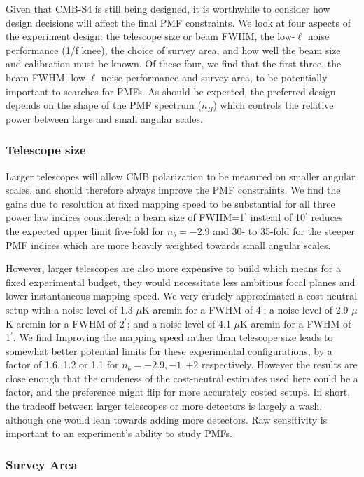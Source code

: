 \documentclass[apj]{emulateapj}
\newcommand{\ukarcmin}{\ensuremath{\mu}K-arcmin}
\begin{document}
Given that CMB-S4 is still being designed, it is worthwhile to consider how design decisions will affect the final PMF constraints. 
We look at four aspects of the experiment design: the telescope size or beam FWHM,  the low-$\ell$ noise performance (1/f knee), the choice of survey area,  and how well the beam size and calibration must be known. 
Of these four, we find that the first three, the beam FWHM, low-$\ell$ noise performance and survey area, to be potentially important to searches for PMFs. 
As should be expected, the preferred design depends on the shape of the PMF spectrum ($n_B$) which controls  the relative power between large and small angular scales. 


\subsubsection{Telescope size}

Larger telescopes will allow CMB polarization to be measured on smaller angular scales, and should therefore always improve the PMF constraints. 
We find the gains due to resolution at fixed mapping speed to be substantial for all three power law indices considered: a beam size of FWHM=1$^\prime$ instead of 10$^\prime$ reduces the expected upper limit five-fold for $n_b=-2.9$ and 30- to 35-fold for the steeper PMF indices which are more heavily weighted towards small angular scales. 

However, larger telescopes are also more expensive to build which means for a fixed experimental budget, they would necessitate less ambitious focal planes and lower instantaneous mapping speed. 
We very crudely approximated a cost-neutral setup with a noise level of 1.3 \ukarcmin{} for a FWHM of 4$^\prime$; a noise level of 2.9 \ukarcmin{} for a FWHM of 2$^\prime$; and a noise level of 4.1 \ukarcmin{} for a FWHM of 1$^\prime$. 
We find 
Improving the mapping speed rather than telescope size leads to somewhat better potential limits for these experimental configurations, by a factor of 1.6, 1.2 or 1.1 for $n_b = -2.9, -1, +2$ respectively. 
However the results are close enough that the crudeness of the cost-neutral estimates used here could be a factor, and the preference might flip for more accurately costed setups. 
In short,  the tradeoff between larger telescopes or more detectors is largely a wash, although one would lean towards adding more detectors. 
Raw sensitivity is important to an experiment's ability to study PMFs.

\subsubsection{Survey Area}
\end{document}
